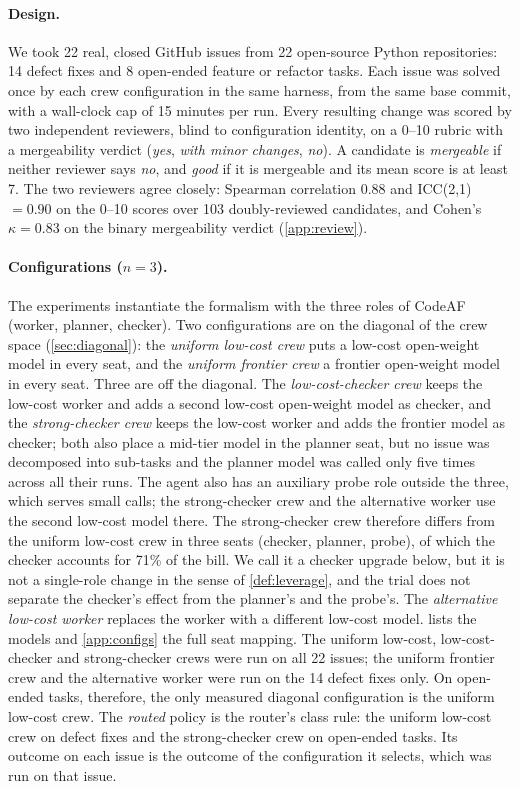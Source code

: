 \documentclass[11pt,a4paper]{article}
\theoremstyle{definition}
\theoremstyle{remark}
\theoremstyle{definition}
\begin{document}
\paragraph{Design.}
We took 22 real, closed GitHub issues from 22 open-source Python repositories: 14 defect fixes and 8 open-ended feature or refactor tasks. Each issue was solved once by each crew configuration in the same harness, from the same base commit, with a wall-clock cap of 15 minutes per run. Every resulting change was scored by two independent reviewers, blind to configuration identity, on a 0--10 rubric with a mergeability verdict (\emph{yes}, \emph{with minor changes}, \emph{no}). A candidate is \emph{mergeable} if neither reviewer says \emph{no}, and \emph{good} if it is mergeable and its mean score is at least 7. The two reviewers agree closely: Spearman correlation 0.88 and ICC(2,1) $=0.90$ on the 0--10 scores over 103 doubly-reviewed candidates, and Cohen's $\kappa=0.83$ on the binary mergeability verdict (\cref{app:review}).

\paragraph{Configurations ($n=3$).}
The experiments instantiate the formalism with the three roles of CodeAF (worker, planner, checker). Two configurations are on the diagonal of the crew space (\cref{sec:diagonal}): the \emph{uniform low-cost crew} puts a low-cost open-weight model in every seat, and the \emph{uniform frontier crew} a frontier open-weight model in every seat. Three are off the diagonal. The \emph{low-cost-checker crew} keeps the low-cost worker and adds a second low-cost open-weight model as checker, and the \emph{strong-checker crew} keeps the low-cost worker and adds the frontier model as checker; both also place a mid-tier model in the planner seat, but no issue was decomposed into sub-tasks and the planner model was called only five times across all their runs. The agent also has an auxiliary probe role outside the three, which serves small calls; the strong-checker crew and the alternative worker use the second low-cost model there. The strong-checker crew therefore differs from the uniform low-cost crew in three seats (checker, planner, probe), of which the checker accounts for 71\% of the bill. We call it a checker upgrade below, but it is not a single-role change in the sense of \cref{def:leverage}, and the trial does not separate the checker's effect from the planner's and the probe's. The \emph{alternative low-cost worker} replaces the worker with a different low-cost model.  lists the models and \cref{app:configs} the full seat mapping. The uniform low-cost, low-cost-checker and strong-checker crews were run on all 22 issues; the uniform frontier crew and the alternative worker were run on the 14 defect fixes only. On open-ended tasks, therefore, the only measured diagonal configuration is the uniform low-cost crew. The \emph{routed} policy is the router's class rule: the uniform low-cost crew on defect fixes and the strong-checker crew on open-ended tasks. Its outcome on each issue is the outcome of the configuration it selects, which was run on that issue.
\end{document}
